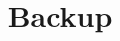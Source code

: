 \documentclass[t,compress]{beamer}
\begin{document}
\title{Backup}
\author{}
\institute{}
\date{}

\begin{frame}
\maketitle
\end{frame}
% 
%  
% 
\end{document}
